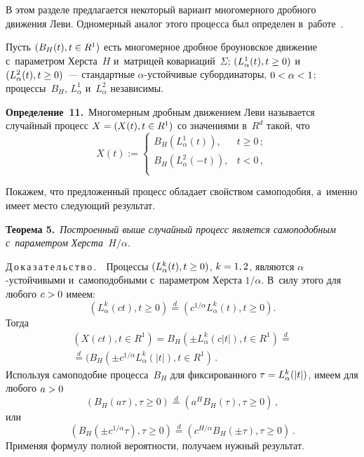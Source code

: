 \begin{multicols}{2}
В этом разделе предлагается  некоторый вариант многомерного дробного движения 
Леви. Одномерный аналог этого процесса был определен
в~работе~\cite{Ni12}.

Пусть $(B_H (t), t\hm\in R^1 )$ есть многомерное дробное броуновское
движение с~параметром Херс\-та~$H$ и~мат\-ри\-цей ковариаций~$\Sigma$;
$(L_{\alpha}^1 (t), t\hm\geq 0)$ и~$(L_{\alpha}^2 (t), t\hm\geq 0)$~---
стандартные $\alpha$-устой\-чи\-вые субординаторы, $0\hm<\alpha \hm< 1$;
процессы~$B_H$, $L_{\alpha}^1$ и~$L_{\alpha}^2$ независимы.

\smallskip

\noindent
\textbf{Определение~11.}\
Многомерным дробным движением Леви называется случайный процесс $X\hm = (X(t) ,
 t\hm\in R^1 )$ со значениями в~$R^d$ такой, что
$$
X(t) := \begin{cases}
B_H (L_{\alpha}^1 (t)), & t\geq 0 \,; \\
B_H (L_{\alpha}^2 (-t)), &  t < 0  \,, \\
\end{cases}
$$


Покажем, что предложенный процесс обладает свойством самоподобия, а~именно имеет место следующий результат.

\smallskip

\noindent
\textbf{Теорема 5.}\
\textit{Построенный выше случайный процесс является самоподобным 
с~параметром Херста~$H/\alpha$}.

\smallskip

\noindent
Д\,о\,к\,а\,з\,а\,т\,е\,л\,ь\,с\,т\,в\,о\,.\ \
Процессы $(L_{\alpha}^k (t), t\hm\geq 0)$, $k\hm=1,2$, являются $\alpha$-устой\-чи\-вы\-ми 
и~самоподобными с~параметром Херста $1/\alpha$.
В~силу этого для любого $c\hm>0$  имеем:
$$
(L_{\alpha}^k (ct), t\geq 0) \stackrel{d}{=}
(c^{1/\alpha} L_{\alpha}^k (t), t\geq 0) .
$$
Тогда
\begin{multline*}
(X(ct) , t\in R^1 ) = B_H (\pm L_{\alpha}^k (c|t|), t\in R^1 ) \stackrel{d}{=}{}\\
{}\stackrel{d}{=}
(B_H (\pm c^{1/\alpha} L_{\alpha}^k (|t|) , t\in R^1 )  \,.
\end{multline*}
Используя самоподобие процесса~$B_H$ для фиксированного
$\tau \hm= L_{\alpha}^k (|t|)$, имеем для любого $a\hm>0$
$$
(B_H (a\tau ), \tau\geq 0) \stackrel{d}{=} (a^H  B_H (\tau),
\tau\geq 0)\,,
$$
или
$$
(B_H (\pm c^{1/\alpha} \tau ), \tau\geq 0) \stackrel{d}{=}
(c^{H/\alpha} B_H (\pm \tau), \tau\geq 0)  \,.
$$
Применяя формулу полной вероятности, получаем нужный результат.


\end{multicols}
